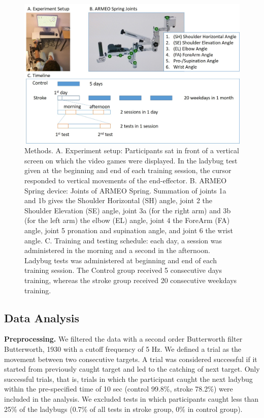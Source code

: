 \begin{figure}
	\centering
	\includegraphics[width=1\linewidth]{figures/1setup&schedule}
	\caption[Methods.]
	{Methods.
		A. Experiment setup: Participants sat in front of a vertical screen on which the video games were displayed. In the ladybug test given at the beginning and end of each training session, the cursor responded to vertical movements of the end-effector. 
		B. ARMEO Spring device: Joints of ARMEO Spring. Summation of joints 1a and 1b gives the Shoulder Horizontal (SH) angle, joint 2 the Shoulder Elevation (SE) angle, joint 3a (for the right arm) and 3b (for the left arm) the elbow (EL) angle, joint 4 the ForeArm (FA) angle, joint 5 pronation and supination angle, and joint 6 the wrist angle. 
		C. Training and testing schedule: each day, a session was administered in the morning and a second in the afternoon. Ladybug tests was administered at beginning and end of each training session. The Control group received 5 consecutive days training, whereas the stroke group received 20 consecutive weekdays training.}
	\label{fig:1setupschedule}
\end{figure}

\subsection{Data Analysis}

\textbf{Preprocessing.}
We filtered the data with a second order Butterworth filter {Butterworth, 1930} with a cutoff frequency of 5 Hz. 
We defined a trial as the movement between two consecutive targets. 
A trial was considered successful if it started from previously caught target and led to the catching of next target. 
Only successful trials, that is, trials in which the participant caught the next ladybug within the pre-specified time of 10 sec (control 99.8\%, stroke 78.2\%) were included in the analysis. 
We excluded tests in which participants caught less than 25\% of the ladybugs (0.7\% of all tests in stroke group, 0\% in control group).

